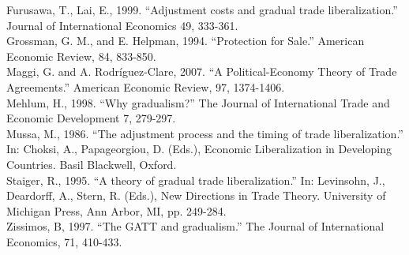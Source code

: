 \documentclass[12pt]{article}
\begin{document}
\noindent Furusawa, T., Lai, E., 1999. ``Adjustment costs and gradual trade liberalization.'' Journal of International
Economics 49, 333-361. \\

\noindent Grossman, G. M., and E. Helpman, 1994. ``Protection for Sale.'' American Economic Review, 84, 833-850. \\

\noindent Maggi, G. and A. Rodr\'{i}guez-Clare, 2007. ``A Political-Economy Theory of Trade Agreements.'' American Economic Review, 97, 1374-1406. \\

\noindent Mehlum, H., 1998. ``Why gradualism?'' The Journal of International Trade and Economic Development 7, 279-297. \\

\noindent Mussa, M., 1986. ``The adjustment process and the timing of trade liberalization.'' In: Choksi, A., Papageorgiou, D. (Eds.), Economic Liberalization in Developing Countries. Basil Blackwell, Oxford. \\

\noindent Staiger, R., 1995. ``A theory of gradual trade liberalization.'' In: Levinsohn, J., Deardorff, A., Stern, R.
(Eds.), New Directions in Trade Theory. University of Michigan Press, Ann Arbor, MI, pp. 249-284. \\

\noindent Zissimos, B, 1997. ``The GATT and gradualism.'' The Journal of International Economics, 71, 410-433.
\end{document}
